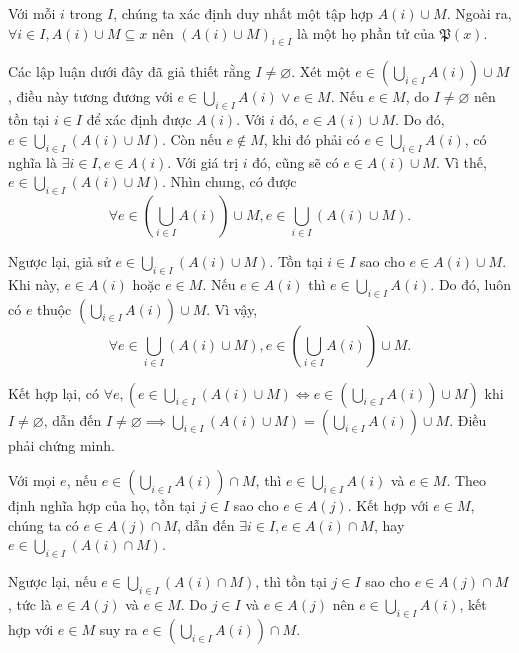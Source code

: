 \stepSubexercise Với mỗi $i$ trong $I$, chúng ta xác định duy nhất một tập hợp $A(i) \cup M$. Ngoài ra, $\forall i \in I, A(i) \cup M \subseteq x$ nên $\left(A(i) \cup M\right)_{i \in I}$ là một họ phần tử của $\mathfrak{P}(x)$.

Các lập luận dưới đây đã giả thiết rằng $I \neq \varnothing$. Xét một $e \in \left(\bigcup_{i \in I}A(i)\right) \cup M$, điều này tương đương với $e \in \bigcup_{i \in I}A(i) \lor e \in M$. Nếu $e \in M$, do $I \neq \varnothing$ nên tồn tại $i \in I$ để xác định được $A(i)$. Với $i$ đó, $e \in A(i) \cup M$. Do đó, $e \in \bigcup_{i \in I} (A(i) \cup M)$. Còn nếu $e \notin M$, khi đó phải có $e \in \bigcup_{i \in I}A(i)$, có nghĩa là $\exists i \in I, e \in A(i)$. Với giá trị $i$ đó, cũng sẽ có $e \in A(i) \cup M$. Vì thế, $e \in \bigcup_{i \in I}(A(i) \cup M)$.
Nhìn chung, có được 
\begin{equation*}
   \forall e \in \left(\bigcup_{i \in I}A(i)\right) \cup M, e \in \bigcup_{i \in I}(A(i) \cup M).
\end{equation*}

Ngược lại, giả sử $e \in \bigcup_{i \in I}(A(i) \cup M)$. Tồn tại $i \in I$ sao cho $e \in A(i) \cup M$. Khi này, $e \in A(i)$ hoặc $e \in M$. Nếu $e \in A(i)$ thì $e \in \bigcup_{i \in I}A(i)$. Do đó, luôn có $e$ thuộc $\left(\bigcup_{i \in I}A(i)\right) \cup M$. Vì vậy,
\begin{equation*}
   \forall e \in \bigcup_{i \in I}(A(i) \cup M), e \in \left(\bigcup_{i \in I}A(i)\right) \cup M.
\end{equation*}

Kết hợp lại, có $\forall e, \left(e \in \bigcup_{i \in I}(A(i) \cup M) \iff e \in \left(\bigcup_{i \in I}A(i)\right) \cup M\right)$ khi $I \neq \varnothing$, dẫn đến $I \neq \varnothing \implies \bigcup_{i \in I}(A(i) \cup M) = \left(\bigcup_{i \in I}A(i)\right) \cup M$. Điều phải chứng minh.

\stepSubexercise Với mọi $e$, nếu $e \in \left(\bigcup_{i \in I}A(i)\right) \cap M$, thì $e \in \bigcup_{i \in I}A(i)$ và $e \in M$. Theo định nghĩa hợp của họ, tồn tại $j \in I$ sao cho $e \in A(j)$. Kết hợp với $e \in M$, chúng ta có $e \in A(j) \cap M$, dẫn đến $\exists i \in I, e \in A(i) \cap M$, hay $e \in \bigcup_{i \in I}(A(i) \cap M)$.

Ngược lại, nếu $e \in \bigcup_{i \in I}(A(i) \cap M)$, thì tồn tại $j \in I$ sao cho $e \in A(j) \cap M$, tức là $e \in A(j)$ và $e \in M$. Do $j \in I$ và $e \in A(j)$ nên $e \in \bigcup_{i \in I}A(i)$, kết hợp với $e \in M$ suy ra $e \in \left(\bigcup_{i \in I}A(i)\right) \cap M$.


